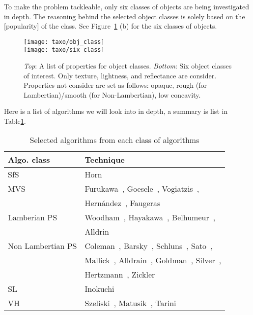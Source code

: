 To make the problem tackleable, only six classes of objects are being investigated in depth. The reasoning behind the selected object classes is solely based on the [popularity] of the class. See Figure~\ref{fig:obj_class} (b) for the six classes of objects.
\begin{figure}[!htbp]
\centering
\texttt{[image: taxo/obj\_class]}\\
\texttt{[image: taxo/six\_class]}\\
\caption{\textit{Top}: A list of properties for object classes. \textit{Bottom}: Six object classes of interest. Only texture, lightness, and reflectance are consider. Properties not consider are set as follows: opaque, rough (for Lambertian)/smooth (for Non-Lambertian), low concavity.}
\label{fig:obj_class}
\end{figure}

Here is a list of algorithms we will look into in depth, a summary is list in Table\ref{tab:class_algo}.
\begin{table}[!ht]
  \centering
  \begin{tabular}{l||l}
  \hline
  \textbf{Algo. class} & \textbf{Technique}\\
  \hline
  SfS & Horn~\cite{horn1970shape}\\
  MVS & Furukawa~\cite{furukawa2010accurate}, Goesele~\cite{goesele2006multi}, Vogiatzis~\cite{vogiatzis2007multiview}, \\
      & Hern{\'a}ndez~\cite{esteban2004silhouette}, Faugeras~\cite{faugeras2002variational}\\
  Lamberian PS & Woodham~\cite{woodham1980photometric}, Hayakawa~\cite{hayakawa1994photometric}, Belhumeur~\cite{belhumeur1999bas}, \\
      & Alldrin~\cite{alldrin2007resolving}\\
  Non Lambertian PS & Coleman~\cite{coleman1982obtaining}, Barsky~\cite{barsky20034}, Schluns~\cite{schluns1993photometric}, Sato~\cite{sato1994temporal}, \\
      & Mallick~\cite{mallick2005beyond}, Alldrain~\cite{alldrin2008photometric}, Goldman~\cite{goldman2010shape}, Silver~\cite{silver1980determining}, \\
      & Hertzmann~\cite{hertzmann2005example}, Zickler~\cite{zickler2002helmholtz}\\
  SL & Inokuchi~\cite{inokuchi1984range}\\
  VH & Szeliski~\cite{szeliski1993rapid}, Matusik~\cite{matusik2002efficient}, Tarini~\cite{tarini2002marching}\\
  \hline
  \end{tabular}
  \caption{Selected algorithms from each class of algorithms}
  \label{tab:class_algo}
\end{table}

